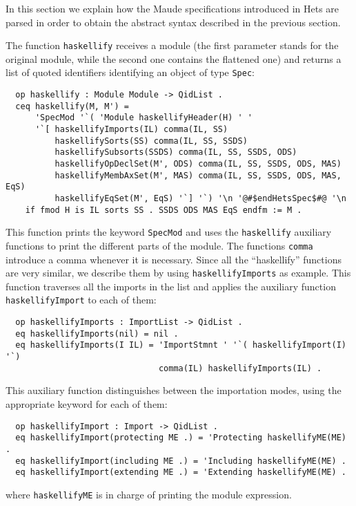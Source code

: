 
In this section we explain how the Maude specifications introduced in
Hets are parsed in order to obtain the abstract syntax described in
the previous section.

The function \verb"haskellify" receives a module (the first parameter
stands for the original module, while the second one contains the
flattened one) and returns a list of quoted identifiers identifying an
object of type \verb"Spec":

{\codesize
\begin{verbatim}
  op haskellify : Module Module -> QidList .
  ceq haskellify(M, M') = 
      'SpecMod '`( 'Module haskellifyHeader(H) ' ' 
      '`[ haskellifyImports(IL) comma(IL, SS)
          haskellifySorts(SS) comma(IL, SS, SSDS)
          haskellifySubsorts(SSDS) comma(IL, SS, SSDS, ODS)
          haskellifyOpDeclSet(M', ODS) comma(IL, SS, SSDS, ODS, MAS)
          haskellifyMembAxSet(M', MAS) comma(IL, SS, SSDS, ODS, MAS, EqS)
          haskellifyEqSet(M', EqS) '`] '`) '\n '@#$endHetsSpec$#@ '\n
    if fmod H is IL sorts SS . SSDS ODS MAS EqS endfm := M .
\end{verbatim}
}

This function prints the keyword \verb"SpecMod" and uses the \verb"haskellify"
auxiliary functions to print the different parts of the module.
The functions \verb"comma" introduce a comma whenever it is necessary.
Since all the ``haskellify'' functions are very similar, we describe
them by using \verb"haskellifyImports" as example. This function traverses
all the imports in the list and applies the auxiliary function
\verb"haskellifyImport" to each of them:

{\codesize
\begin{verbatim}
  op haskellifyImports : ImportList -> QidList .
  eq haskellifyImports(nil) = nil .
  eq haskellifyImports(I IL) = 'ImportStmnt ' '`( haskellifyImport(I) '`)
                               comma(IL) haskellifyImports(IL) .
\end{verbatim}
}

This auxiliary function distinguishes between the importation modes,
using the appropriate keyword for each of them:

{\codesize
\begin{verbatim}
  op haskellifyImport : Import -> QidList .
  eq haskellifyImport(protecting ME .) = 'Protecting haskellifyME(ME) .
  eq haskellifyImport(including ME .) = 'Including haskellifyME(ME) .
  eq haskellifyImport(extending ME .) = 'Extending haskellifyME(ME) .
\end{verbatim}
}

\noindent where \verb"haskellifyME" is in charge of printing the 
module expression.

